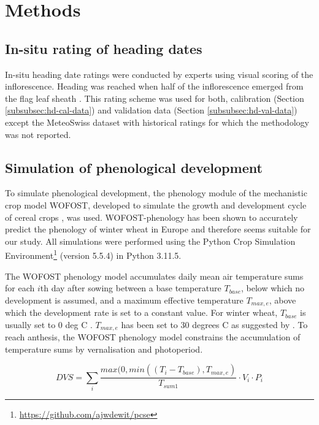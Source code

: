 \section{Methods}
\label{sec:hd-methods}
\subsection{In-situ rating of heading dates}
\label{subsec:rating-method}
In-situ heading date ratings were conducted by experts using visual scoring of the inflorescence. Heading was reached when half of the inflorescence emerged from the flag leaf sheath \citep{meier_growth_2018}. This rating scheme was used for both, calibration (Section \ref{subsubsec:hd-cal-data}) and validation data (Section \ref{subsubsec:hd-val-data}) except the MeteoSwiss dataset with historical ratings for which the methodology was not reported.

\subsection{Simulation of phenological development}
To simulate phenological development, the phenology module of the mechanistic crop model \gls{WOFOST}, developed to simulate the growth and development cycle of cereal crops \citep{diepen_wofost_1989}, was used. WOFOST-phenology has been shown to accurately predict the phenology of winter wheat in Europe \citep{ceglar_improving_2019} and therefore seems suitable for our study.
All simulations were performed using the Python Crop Simulation Environment\footnote{\url{https://github.com/ajwdewit/pcse}} (version 5.5.4) in Python 3.11.5.

The \gls{WOFOST} phenology model accumulates daily mean air temperature sums for each $i$th day after sowing between a base temperature $T_{base}$, below which no development is assumed, and a maximum effective temperature $T_{max, e}$, above which the development rate is set to a constant value. For winter wheat, $T_{base}$ is usually set to 0 deg C \citep{porter_temperatures_1999}. $T_{max,e}$ has been set to 30 degrees C as suggested by \cite{ceglar_improving_2019}. To reach anthesis, the \gls{WOFOST} phenology model constrains the accumulation of temperature sums by vernalisation and photoperiod.

\begin{equation}
\label{eq:dvs}
    DVS = \sum_i \frac{max(0, min((T_i-T_{base}), T_{max, e})}{T_{sum1}} \cdot V_{i} \cdot P_{i}
\end{equation}

